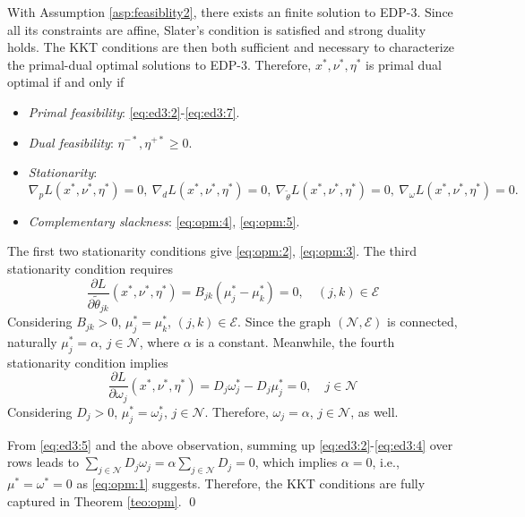 \documentclass[journal,12pt,onecolumn,draftclsnofoot]{IEEEtran}
\newcommand{\beq}{\begin{equation}}
\newcommand{\eeq}{\end{equation}}
\begin{document}
With Assumption \ref{asp:feasiblity2}, there exists an finite solution to EDP-3. Since all its constraints are affine, Slater's condition is satisfied and strong duality holds. The KKT conditions are then both sufficient and necessary to characterize the primal-dual optimal solutions to EDP-3. Therefore, $x^*,\nu^*,\eta^*$ is primal dual optimal if and only if
\begin{itemize}
\item \emph{Primal feasibility}: \eqref{eq:ed3:2}-\eqref{eq:ed3:7}.
\item \emph{Dual feasibility}: $\eta^{-*},\eta^{+*}\ge 0$.
\item \emph{Stationarity}: 
\begin{displaymath}
\nabla_p L(x^*,\nu^*,\eta^*)=0,~\nabla_d L(x^*,\nu^*,\eta^*)=0,~\nabla_{\tilde{\theta}} L(x^*,\nu^*,\eta^*)=0,~\nabla_\omega L(x^*,\nu^*,\eta^*)=0.
\end{displaymath}
\item \emph{Complementary slackness}: \eqref{eq:opm:4}, \eqref{eq:opm:5}.
\end{itemize}  

The first two stationarity conditions give \eqref{eq:opm:2}, \eqref{eq:opm:3}. The third stationarity condition requires
\begin{equation}
    \frac{\partial L}{\partial \tilde \theta_{jk} }(x^*,\nu^*,\eta^*) = B_{jk} (\mu_j^*-\mu_k^*)= 0,\quad (j,k)\in\mathcal{E}
\end{equation}
Considering $B_{jk} >0$, $\mu^*_j=\mu^*_k$, $(j,k)\in\mathcal{E}$. Since the graph $(\mathcal{N},\mathcal{E})$ is connected, naturally $\mu^*_j=\alpha$, $j\in\mathcal{N}$, where $\alpha$ is a constant. Meanwhile, the fourth stationarity condition implies 
\beq
\frac{\partial L}{\partial \omega_j}(x^*,\nu^*,\eta^*)= D_j\omega_j^* -D_j \mu_j^* = 0,\quad j \in\mathcal{N}
\eeq
Considering $D_j>0$, $\mu_j^*=\omega_j^*$, $j\in\mathcal{N}$. Therefore, $\omega_j=\alpha$, $j\in\mathcal{N}$, as well.

From \eqref{eq:ed3:5} and the above observation, summing up \eqref{eq:ed3:2}-\eqref{eq:ed3:4} over rows leads to $\sum_{j\in\mathcal{N}} D_j\omega_j = \alpha \sum_{j\in\mathcal{N}} D_j=0$, which implies $\alpha = 0$, i.e., $\mu^*=\omega^*={0}$ as \eqref{eq:opm:1} suggests. Therefore, the KKT conditions are fully captured in Theorem \ref{teo:opm}.     
\qed  
\end{document}
